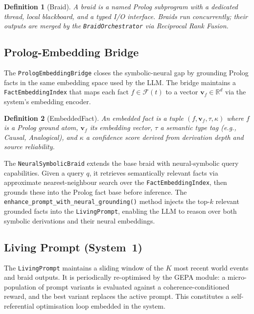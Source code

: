 \documentclass[11pt]{article}
\newtheorem{definition}{Definition}
\begin{document}
\begin{definition}[Braid]
A \emph{braid} is a named Prolog subprogram with a dedicated thread, local
blackboard, and a typed I/O interface. Braids run concurrently; their outputs
are merged by the \texttt{BraidOrchestrator} via Reciprocal Rank Fusion.
\end{definition}

\subsection{Prolog-Embedding Bridge}

The \texttt{PrologEmbeddingBridge} closes the symbolic-neural gap by grounding
Prolog facts in the same embedding space used by the LLM. The bridge maintains
a \texttt{FactEmbeddingIndex} that maps each fact $f \in \mathcal{F}(t)$ to a
vector $\mathbf{v}_f \in \mathbb{R}^d$ via the system's embedding encoder.

\begin{definition}[EmbeddedFact]
An \emph{embedded fact} is a tuple $(f, \mathbf{v}_f, \tau, \kappa)$ where
$f$ is a Prolog ground atom, $\mathbf{v}_f$ its embedding vector, $\tau$ a
semantic type tag (e.g., Causal, Analogical), and $\kappa$
a confidence score derived from derivation depth and source reliability.
\end{definition}

The \texttt{NeuralSymbolicBraid} extends the base braid with neural-symbolic
query capabilities. Given a query $q$, it retrieves semantically relevant facts
via approximate nearest-neighbour search over the \texttt{FactEmbeddingIndex},
then grounds these into the Prolog fact base before inference. The
\texttt{enhance\_prompt\_with\_neural\_grounding()} method injects the top-$k$
relevant grounded facts into the \texttt{LivingPrompt}, enabling the LLM to
reason over both symbolic derivations and their neural embeddings.

\subsection{Living Prompt (System~1)}

The \texttt{LivingPrompt} maintains a sliding window of the $K$ most recent
world events and braid outputs. It is periodically re-optimised by the GEPA
module: a micro-population of prompt variants is evaluated against a
coherence-conditioned reward, and the best variant replaces the active prompt.
This constitutes a self-referential optimisation loop embedded in the system.
\end{document}
